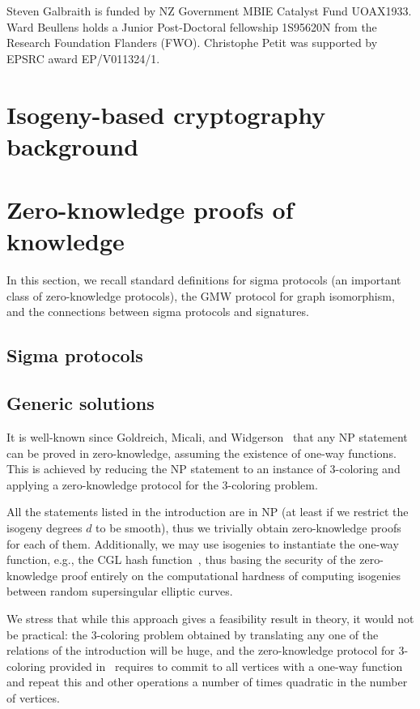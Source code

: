 \documentclass{llncs}
\begin{document}
Steven Galbraith is funded by NZ Government MBIE Catalyst Fund UOAX1933. Ward Beullens holds a Junior Post-Doctoral fellowship 1S95620N from the Research Foundation Flanders (FWO).
%
Christophe Petit was supported by EPSRC award EP/V011324/1.



\section{Isogeny-based cryptography background \label{sec:IBC}}




\section{Zero-knowledge proofs of knowledge\label{sec:ZK}}

In this section, we recall standard definitions for sigma protocols (an important class of zero-knowledge protocols), the GMW protocol for graph isomorphism, and the connections between sigma protocols and signatures.

\subsection{Sigma protocols}




\subsection{Generic solutions}

It is well-known since Goldreich, Micali, and Widgerson~\cite{GMW} that any NP statement can be proved in zero-knowledge, assuming the existence of one-way functions. This is achieved by reducing the NP statement to an instance of 3-coloring and applying a zero-knowledge protocol for the 3-coloring problem.

All the statements listed in the introduction are in NP (at least if we restrict the isogeny degrees $d$ to be smooth), thus we trivially obtain zero-knowledge proofs for each of them.
Additionally, we may use isogenies to instantiate the one-way function, e.g., the CGL hash function~\cite{CGL}, thus basing the security of the zero-knowledge proof entirely on the computational hardness of computing isogenies between random supersingular elliptic curves.

We stress that while this approach gives a feasibility result in theory,  it would not be practical: the 3-coloring problem obtained by translating any one of the relations of the introduction will be huge, and the zero-knowledge protocol for 3-coloring provided in~\cite{GMW} requires to commit to all vertices with a one-way function and repeat this and other operations a number of times quadratic in the number of vertices.
\end{document}
